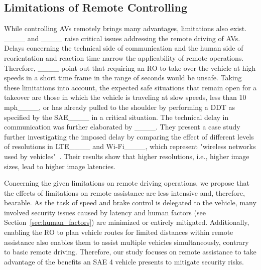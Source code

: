 \subsection{Limitations of Remote Controlling}
\label{sec:limitations}
While controlling AVs remotely brings many advantages, limitations also exist. ____ and ____ raise critical issues addressing the remote driving of AVs. Delays concerning the technical side of communication and the human side of reorientation and reaction time narrow the applicability of remote operations. Therefore, ____ point out that requiring an RO to take over the vehicle at high speeds in a short time frame in the range of seconds would be unsafe. Taking these limitations into account, the expected safe situations that remain open for a takeover are those in which the vehicle is traveling at slow speeds, less than 10 mph____, or has already pulled to the shoulder by performing a DDT as specified by the SAE____ in a critical situation.
The technical delay in communication was further elaborated by ____. They present a case study further investigating the imposed delay by comparing the effect of different levels of resolutions in LTE____ and Wi-Fi____, which represent "wireless networks used by vehicles"~\cite[p. 22]{kang_augmenting_2018}.
Their results show that higher resolutions, i.e., higher image sizes, lead to higher image latencies. %

Concerning the given limitations on remote driving operations, we propose that the effects of limitations on remote assistance are less intensive and, therefore, bearable. As the task of speed and brake control is delegated to the vehicle, many involved security issues caused by latency and human factors (see  Section~\ref{sec:human_factors}) are minimized or entirely mitigated. Additionally, enabling the RO to plan vehicle routes for limited distances within remote assistance also enables them to assist multiple vehicles simultaneously, contrary to basic remote driving.
Therefore, our study focuses on remote assistance to take advantage of the benefits an SAE 4 vehicle presents to mitigate security risks.

